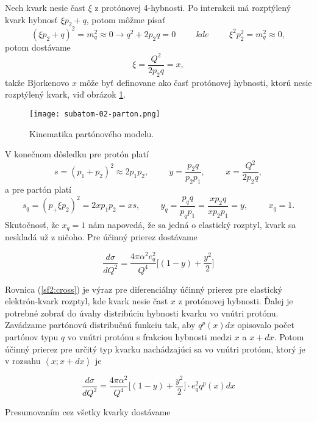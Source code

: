 \documentclass[../../main.tex]{subfiles}
\begin{document}
Nech kvark nesie čast $\xi$ z protónovej 4-hybnosti. Po interakcii má rozptýlený kvark hybnosť $\xi p_2+q$, potom môžme písať
$$ (\xi p_2+q)^2=m^2_q \approx 0 \rightarrow q^2+2p_2q=0 \hspace{1cm} kde \hspace{1cm} \xi^2 p_2^2 = m^2_q \approx 0, $$
potom dostávame $$ \xi = \frac{Q^2}{2p_2q} = x, $$
takže Bjorkenovo $x$ môže byť definovane ako časť protónovej hybnosti, ktorú nesie rozptýlený kvark, viď obrázok \ref{sf2:fig:parton}.

\begin{figure}[!h]
\texttt{[image: subatom-02-parton.png]}
\centering
\caption{Kinematika partónového modelu.}
\label{sf2:fig:parton}
\end{figure}

V konečnom dôsledku pre protón platí
$$ s=(p_1+p_2)^2\approx 2p_1p_2, \hspace{1cm} y=\frac{p_2q}{p_2 p_1}, \hspace{1cm} x=\frac{Q^2}{2p_2q},$$
a pre partón platí
$$ s_q=(p_+\xi p_2)^2=2xp_1p_2=xs, \hspace{1cm} y_q=\frac{p_qq}{p_qp_1}=\frac{xp_2q}{xp_2p_1} = y, \hspace{1cm} x_q=1 .$$
Skutočnosť, že $x_q=1$ nám napovedá, že sa jedná o elastický rozptyl, kvark sa neskladá už z ničoho. Pre účinný prierez dostávame 

\begin{equation}
\frac{d\sigma}{dQ^2} = \frac{4\pi\alpha^2 e_q^2}{Q^4}\bigg[ (1-y)+\frac{y^2}{2} \bigg]
\label{sf2:cross}
\end{equation}

Rovnica (\ref{sf2:cross}) je výraz pre diferenciálny účinný prierez pre elastický elektrón-kvark rozptyl, kde kvark nesie čast $x$ z protónovej hybnosti. Ďalej je potrebné zobrať do úvahy distribúciu hybnosti kvarku vo vnútri protónu. Zavádzame partónovú distribučnú funkciu tak, aby $q^p(x)dx$ opisovalo počet partónov typu $q$ vo vnútri protónu s frakciou hybnosti medzi $x$ a $x+dx$. Potom účinný prierez pre určitý typ kvarku nachádzajúci sa vo vnútri protónu, ktorý je v rozsahu $\left\langle x ; x+dx\right\rangle $ je

\begin{equation}
\frac{d\sigma}{dQ^2} = \frac{4\pi\alpha^2}{Q^4}\bigg[ (1-y)+\frac{y^2}{2} \bigg]\cdot e^2_q q^p(x)dx
\label{sf2:cross1}
\end{equation}

Presumovaním cez všetky kvarky dostávame
\end{document}

